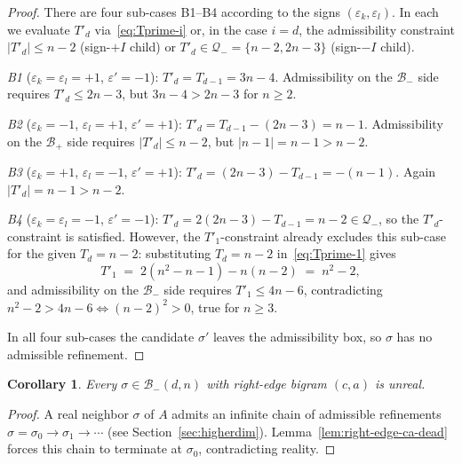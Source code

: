 \documentclass{amsart}
\newtheorem{corollary}[theorem]{Corollary}
\theoremstyle{definition}
\theoremstyle{remark}
\begin{document}
\begin{proof}
There are four sub-cases B1--B4 according to the signs
$(\varepsilon_k, \varepsilon_l)$.  In each we evaluate
$T'_d$ via~\eqref{eq:Tprime-i} or, in the case $i = d$, the
admissibility constraint $|T'_d| \le n - 2$ (sign-$+I$ child) or
$T'_d \in \mathcal{Q}_- = \{n-2, 2n-3\}$ (sign-$-I$ child).

\smallskip\noindent\emph{B1} \textup{(}$\varepsilon_k = \varepsilon_l =
+1$, $\varepsilon' = -1$\textup{)}: $T'_d = T_{d-1} = 3n - 4$.
Admissibility on the $\mathcal{B}_-$ side requires
$T'_d \le 2n - 3$, but $3n - 4 > 2n - 3$ for $n \ge 2$.

\smallskip\noindent\emph{B2} \textup{(}$\varepsilon_k = -1$,
$\varepsilon_l = +1$, $\varepsilon' = +1$\textup{)}:
$T'_d = T_{d-1} - (2n - 3) = n - 1$.
Admissibility on the $\mathcal{B}_+$ side requires
$|T'_d| \le n - 2$, but $|n - 1| = n - 1 > n - 2$.

\smallskip\noindent\emph{B3} \textup{(}$\varepsilon_k = +1$,
$\varepsilon_l = -1$, $\varepsilon' = +1$\textup{)}:
$T'_d = (2n - 3) - T_{d-1} = -(n - 1)$.
Again $|T'_d| = n - 1 > n - 2$.

\smallskip\noindent\emph{B4} \textup{(}$\varepsilon_k = \varepsilon_l =
-1$, $\varepsilon' = -1$\textup{)}:
$T'_d = 2(2n - 3) - T_{d-1} = n - 2 \in \mathcal{Q}_-$, so the
$T'_d$-constraint is satisfied.  However, the $T'_1$-constraint
already excludes this sub-case for the given $T_d = n - 2$:
substituting $T_d = n - 2$ in~\eqref{eq:Tprime-1} gives
\[
  T'_1 \;=\; 2(n^2 - n - 1) - n(n - 2) \;=\; n^2 - 2,
\]
and admissibility on the $\mathcal{B}_-$ side requires
$T'_1 \le 4n - 6$, contradicting
$n^2 - 2 > 4n - 6 \iff (n - 2)^2 > 0$, true for $n \ge 3$.

\smallskip
In all four sub-cases the candidate $\sigma'$ leaves the
admissibility box, so $\sigma$ has no admissible refinement.
\end{proof}

\begin{corollary}\label{cor:right-edge-ca-unreal}
Every $\sigma \in \mathcal{B}_-(d, n)$ with right-edge bigram
$(c, a)$ is unreal.
\end{corollary}

\begin{proof}
A real neighbor $\sigma$ of $A$ admits an infinite chain of
admissible refinements $\sigma = \sigma_0 \to \sigma_1 \to \cdots$
\textup{(}see Section~\ref{sec:higherdim}\textup{)}.
Lemma~\ref{lem:right-edge-ca-dead} forces this chain to terminate
at $\sigma_0$, contradicting reality.
\end{proof}
\end{document}
